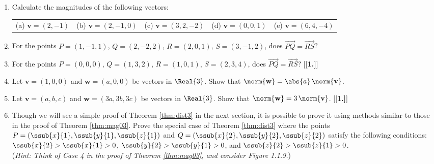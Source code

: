 \begin{enumerate}[\bfseries 1.]
 \item Calculate the magnitudes of the following vectors:\\
  \begin{tabular}{@{} l l l l l @{}}
   (a) $\textbf{v} = (2,-1)$ & (b) $\textbf{v} = (2,-1,0)$ & (c) $\textbf{v} = (3,2,-2)$ & (d) $\textbf{v} = (0,0,1)$ &
   (e) $\textbf{v} = (6,4,-4)$
  \end{tabular}
 \item For the points $P =(1,-1,1)$, $Q=(2,-2,2)$, $R=(2,0,1)$, $S=(3,-1,2)$, does $\overrightarrow{PQ} =
  \overrightarrow{RS}$?
 \item For the points $P =(0,0,0)$, $Q=(1,3,2)$, $R=(1,0,1)$, $S=(2,3,4)$, does $\overrightarrow{PQ} =
  \overrightarrow{RS}$?
[{[\bfseries 1.]}]
 \item Let $\textbf{v} = (1,0,0)$ and $\textbf{w} = (a,0,0)$ be vectors in $\Real{3}$. Show that
 $\norm{\textbf{w}} = \abs{a} \,\norm{\textbf{v}}$.
 \item Let $\textbf{v} = (a,b,c)$ and $\textbf{w} = (3a,3b,3c)$ be vectors in $\Real{3}$. Show that
 $\norm{\textbf{w}}  = 3 \,\norm{\textbf{v}}$.
[{[\bfseries 1.]}]
 \piccaption[]{}
 \item Though we will see a simple proof of Theorem \ref{thm:dist3} in the next section, it is possible to prove it using
 methods similar to those in the proof of Theorem \ref{thm:mag03}.  Prove the special case of Theorem \ref{thm:dist3}
 where the points $P = (\ssub{x}{1},\ssub{y}{1},\ssub{z}{1})$ and $Q = (\ssub{x}{2},\ssub{y}{2},\ssub{z}{2})$
 satisfy the following conditions:\\
 $\ssub{x}{2} > \ssub{x}{1} > 0$, $\ssub{y}{2} > \ssub{y}{1} > 0$, and
 $\ssub{z}{2} > \ssub{z}{1} > 0$.\\(\emph{Hint: Think of Case 4 in the proof of
 Theorem \ref{thm:mag03}, and consider Figure 1.1.9.})\\
\end{enumerate}
\newpage

